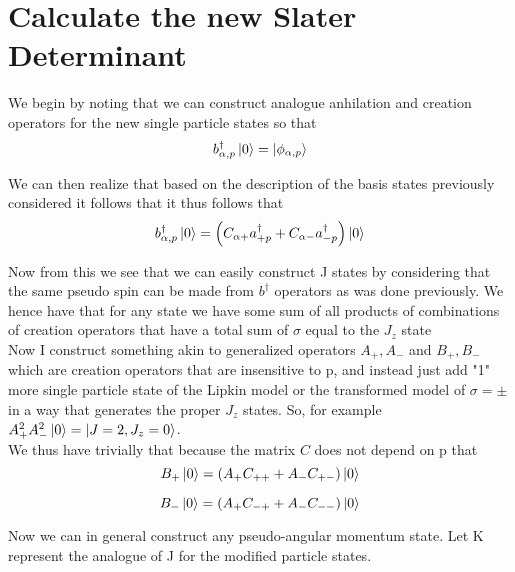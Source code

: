 \documentclass[11pt]{article} %
\begin{document}
\section{Calculate the new Slater Determinant}

We begin by noting that we can construct analogue anhilation and creation operators for the new single particle states so that\\

\begin{equation} b_{\alpha,p}^\dagger\ket{0}=\ket{ \phi_{\alpha,p}} \end{equation}

We can then realize that based on the description of the basis states previously considered it follows that it thus follows that\\

\begin{equation}
b_{\alpha,p}^\dagger \ket{0}=\left(C_{\alpha+}a_{+p}^\dagger+C_{\alpha-}a_{-p}^\dagger\right)\ket{0}\end{equation}


Now from this we see that we can easily construct J states by considering that the same pseudo spin can be made from $b^\dagger$ operators as was done previously. We hence have that for any state we have some sum of all products of combinations of creation operators that have a total sum of $\sigma$ equal to the $J_z$ state\\

Now I construct something akin to generalized operators $A_+ ,A_-$ and $B_+,B_-$ which are creation operators that are insensitive to p, and instead just add "1" more single particle state of the Lipkin model or the transformed model of $\sigma =\pm$ in a way that generates the proper $J_z$ states. So, for example $A_+^2A_-^2 \ket{0} = \ket{J=2,J_z=0}$.\\

We thus have trivially that because the matrix $C$ does not depend on p that \\

\begin{equation}
B_+ \ket{0}=(A_+ C_{++}+A_- C_{+-})\ket{0}\end{equation}

\begin{equation}
B_- \ket{0}=(A_+ C_{-+}+A_- C_{--})\ket{0}\end{equation}

Now we can in general construct any pseudo-angular momentum state. Let K represent the analogue of J for the modified particle states.\\
\end{document}
